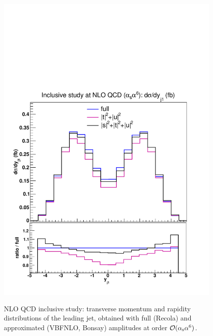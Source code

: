 \begin{figure}[hbt]
{\includegraphics[scale=0.35]{figures/scanfigures/yj1_nlo.pdf}}
\caption{NLO QCD inclusive study: transverse momentum and rapidity distributions of the leading jet, obtained with full ({\sc Recola}) and approximated ({\sc VBFNLO, Bonsay}) amplitudes at order $\mathcal{O}(\alpha_\text{s}\alpha^6)$.} \label{fig:mjjdyjj_1d_2}
\end{figure}

